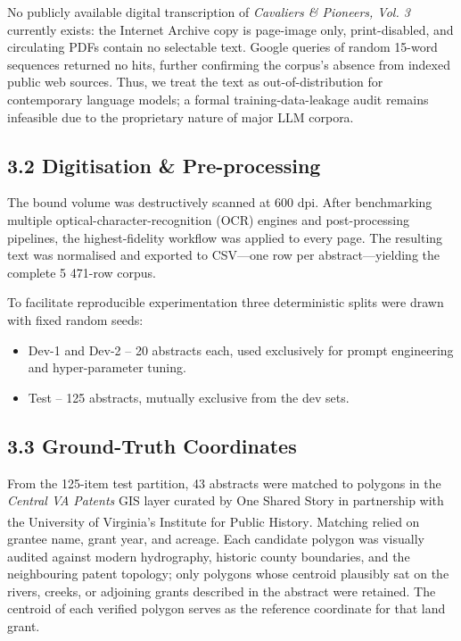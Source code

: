 \documentclass[
  10pt,
  twocolumn]{article}
\providecommand{\tightlist}{%
  \setlength{\itemsep}{0pt}\setlength{\parskip}{0pt}}
\begin{document}
No publicly available digital transcription of \emph{Cavaliers \&
Pioneers, Vol. 3} currently exists: the Internet Archive copy is
page-image only, print-disabled, and circulating PDFs contain no
selectable text. Google queries of random 15-word sequences returned no
hits, further confirming the corpus's absence from indexed public web
sources. Thus, we treat the text as out-of-distribution for contemporary
language models; a formal training-data-leakage audit remains infeasible
due to the proprietary nature of major LLM corpora.

\subsection{3.2 Digitisation \&
Pre-processing}\label{digitisation-pre-processing}

The bound volume was destructively scanned at 600 dpi. After
benchmarking multiple optical-character-recognition (OCR) engines and
post-processing pipelines, the highest-fidelity workflow was applied to
every page. The resulting text was normalised and exported to CSV---one
row per abstract---yielding the complete 5 471-row corpus.

To facilitate reproducible experimentation three deterministic splits
were drawn with fixed random seeds:

\begin{itemize}
\tightlist
\item
  Dev-1 and Dev-2 -- 20 abstracts each, used exclusively for prompt
  engineering and hyper-parameter tuning.
\item
  Test -- 125 abstracts, mutually exclusive from the dev sets.
\end{itemize}

\subsection{3.3 Ground-Truth
Coordinates}\label{ground-truth-coordinates}

From the 125-item test partition, 43 abstracts were matched to polygons
in the \emph{Central VA Patents} GIS layer curated by One Shared Story
in partnership with the University of Virginia's Institute for Public
History\textsuperscript{}.
Matching relied on grantee name, grant year, and acreage. Each candidate
polygon was visually audited against modern hydrography, historic county
boundaries, and the neighbouring patent topology; only polygons whose
centroid plausibly sat on the rivers, creeks, or adjoining grants
described in the abstract were retained. The centroid of each verified
polygon serves as the reference coordinate for that land grant.
\end{document}
